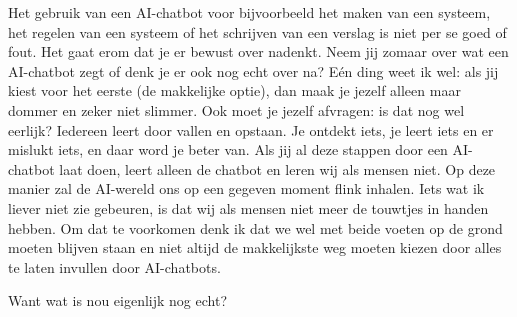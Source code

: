 Het gebruik van een AI-chatbot voor bijvoorbeeld het maken van een systeem, het regelen van een systeem of het schrijven van een verslag is niet per se goed of fout. Het gaat erom dat je er bewust over nadenkt. Neem jij zomaar over wat een AI-chatbot zegt of denk je er ook nog echt over na? Eén ding weet ik wel: als jij kiest voor het eerste (de makkelijke optie), dan maak je jezelf alleen maar dommer en zeker niet slimmer. Ook moet je jezelf afvragen: is dat nog wel eerlijk? Iedereen leert door vallen en opstaan. Je ontdekt iets, je leert iets en er mislukt iets, en daar word je beter van. Als jij al deze stappen door een AI-chatbot laat doen, leert alleen de chatbot en leren wij als mensen niet. Op deze manier zal de AI-wereld ons op een gegeven moment flink inhalen. Iets wat ik liever niet zie gebeuren, is dat wij als mensen niet meer de touwtjes in handen hebben. Om dat te voorkomen denk ik dat we wel met beide voeten op de grond moeten blijven staan en niet altijd de makkelijkste weg moeten kiezen door alles te laten invullen door AI-chatbots.

\vspace{.25cm}

Want wat is nou eigenlijk nog echt?




\cite{cm}
\cite{De_Volkskrant}
\cite{Filosofie}
